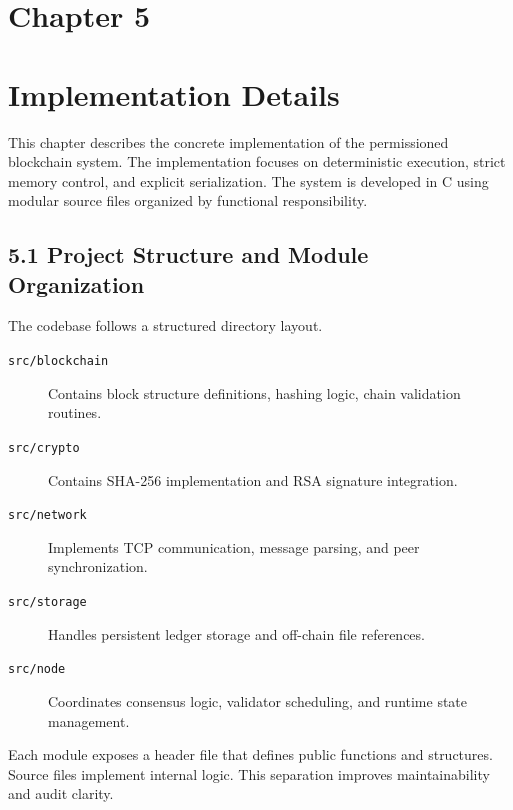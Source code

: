 \newpage
\section*{Chapter 5}
\label{ch:5}

\section*{Implementation Details}

This chapter describes the concrete implementation of the permissioned blockchain system. The implementation focuses on deterministic execution, strict memory control, and explicit serialization. The system is developed in C using modular source files organized by functional responsibility.

\subsection*{5.1 Project Structure and Module Organization}
The codebase follows a structured directory layout.
\begin{description}
\item[\texttt{src/blockchain}]
Contains block structure definitions, hashing logic, chain validation routines.
\item[\texttt{src/crypto}]
Contains SHA-256 implementation and RSA signature integration.
\item[\texttt{src/network}]
Implements TCP communication, message parsing, and peer synchronization.
\item[\texttt{src/storage}]
Handles persistent ledger storage and off-chain file references.
\item[\texttt{src/node}]
Coordinates consensus logic, validator scheduling, and runtime state management.
\end{description}
Each module exposes a header file that defines public functions and structures. Source files implement internal logic. This separation improves maintainability and audit clarity.

